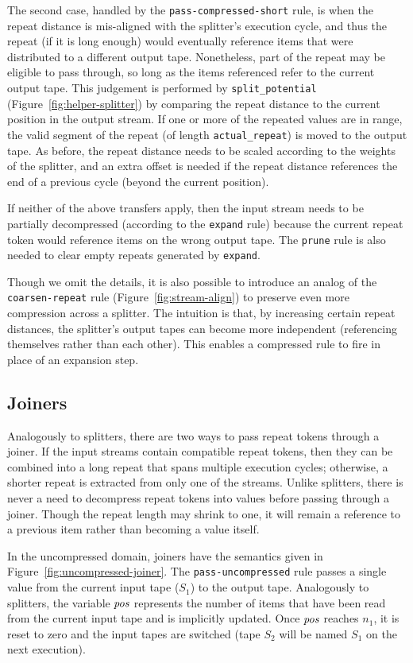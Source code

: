 The second case, handled by the {\tt pass-compressed-short} rule, is
when the repeat distance is mis-aligned with the splitter's execution
cycle, and thus the repeat (if it is long enough) would eventually
reference items that were distributed to a different output tape.
Nonetheless, part of the repeat may be eligible to pass through, so
long as the items referenced refer to the current output tape.  This
judgement is performed by {\tt split\_potential}
(Figure~\ref{fig:helper-splitter}) by comparing the repeat distance to
the current position in the output stream.  If one or more of the
repeated values are in range, the valid segment of the repeat (of
length {\tt actual\_repeat}) is moved to the output tape.  As before,
the repeat distance needs to be scaled according to the weights of the
splitter, and an extra offset is needed if the repeat distance
references the end of a previous cycle (beyond the current position).

If neither of the above transfers apply, then the input stream needs
to be partially decompressed (according to the {\tt expand} rule)
because the current repeat token would reference items on the wrong
output tape.  The {\tt prune} rule is also needed to clear empty
repeats generated by {\tt expand}.

Though we omit the details, it is also possible to introduce an analog
of the {\tt coarsen-repeat} rule (Figure~\ref{fig:stream-align}) to
preserve even more compression across a splitter.  The intuition is
that, by increasing certain repeat distances, the splitter's output
tapes can become more independent (referencing themselves rather than
each other).  This enables a compressed rule to fire in place of an
expansion step.

\subsection{Joiners}

Analogously to splitters, there are two ways to pass repeat tokens
through a joiner.  If the input streams contain compatible repeat
tokens, then they can be combined into a long repeat that spans
multiple execution cycles; otherwise, a shorter repeat is extracted
from only one of the streams.  Unlike splitters, there is never a need
to decompress repeat tokens into values before passing through a
joiner.  Though the repeat length may shrink to one, it will remain a
reference to a previous item rather than becoming a value itself.

In the uncompressed domain, joiners have the semantics given in
Figure~\ref{fig:uncompressed-joiner}.  The {\tt pass-uncompressed}
rule passes a single value from the current input tape ($S_1$) to the
output tape.  Analogously to splitters, the variable $\mbox{\it pos}$ represents
the number of items that have been read from the current input tape
and is implicitly updated.  Once $\mbox{\it pos}$ reaches $n_1$, it is reset to
zero and the input tapes are switched (tape $S_2$ will be named $S_1$
on the next execution).

